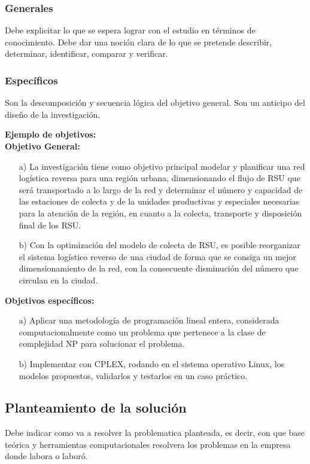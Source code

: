 \subsubsection{Generales}
Debe explicitar lo que se espera lograr con el estudio en términos de conocimiento. Debe dar una noción clara de lo que se pretende describir, determinar, identificar, comparar y verificar.


\subsubsection{Específicos}
Son la descomposición y secuencia lógica del objetivo general. Son un anticipo del diseño de la investigación.
\vskip 0.3cm


{\bf Ejemplo de objetivos:}\\
{\bf Objetivo General:}
\begin{enumerate}
\item[a)] La investigación tiene como objetivo principal modelar y planificar una red logística reversa para una región urbana, dimensionando el flujo de RSU que será transportado a lo largo de la red y determinar el número y capacidad de las estaciones de colecta y de la unidades productivas y especiales necesarias para la atención de la región, en cuanto a la colecta, transporte y disposición final de los RSU.
\vskip 0.3cm
\item[b)]Con la optimización del modelo de colecta de RSU, es posible reorganizar el sistema logístico reverso de una ciudad de forma que se consiga un mejor dimensionamiento de la red, con la consecuente disminución del número que circulan en la ciudad.
\end{enumerate}
\vskip 0.2cm
{\bf Objetivos específicos:}
\begin{enumerate}
\item[a)] Aplicar una metodología de programación lineal entera, considerada computacionalmente como un problema que pertenece a la clase de complejidad NP \citep{Korte} para solucionar el problema.
\item[b)] Implementar con CPLEX, rodando en el sistema operativo Linux, los modelos propuestos, validarlos y testarlos en un caso práctico.
\end{enumerate}


\subsection{Planteamiento de la solución}
Debe indicar como va a resolver la problematica planteada, es decir, con que base teórica y herramientas computacionales resolvera los problemas en la empresa donde labora o laboró.


